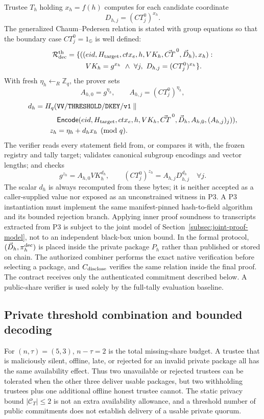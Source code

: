 \documentclass[pdflatex,sn-mathphys-num]{sn-jnl}%
\theoremstyle{thmstyleone}%
\theoremstyle{thmstyletwo}%
\theoremstyle{thmstylethree}%
\begin{document}
Trustee $T_h$ holding $x_h=f(h)$ computes for each candidate coordinate
\[
 D_{h,j}=(CT_j^0)^{x_h}.
\]
The generalized Chaum--Pedersen relation is stated with group equations so
that the boundary case $CT_j^0=1_{\mathbb G}$ is well defined:
\[
\begin{aligned}
 \mathcal R_{\rm dec}^{\rm th}=\{((&eid,H_{\rm target},ctx_e,h,
 VK_h,\vec{CT}^{\,0},\vec D_h),x_h):\\
 &VK_h=g^{x_h}\ \land\
 \forall j,\ D_{h,j}=(CT_j^0)^{x_h}\}.
\end{aligned}
\]
With fresh $\eta_h\leftarrow_R\mathbb Z_q$, the prover sets
\[
 A_{h,0}=g^{\eta_h},\qquad A_{h,j}=(CT_j^0)^{\eta_h},
\]
\[
\begin{aligned}
 d_h=H_q(&\mathtt{VV/THRESHOLD/DKEY/v1}\parallel\\
 &\mathsf{Encode}(eid,H_{\rm target},ctx_e,h,VK_h,
 \vec{CT}^{\,0},\vec D_h,A_{h,0},(A_{h,j})_j)),\\
 z_h&=\eta_h+d_hx_h\pmod q.
\end{aligned}
\]
The verifier reads every statement field from, or compares it with, the frozen
registry and tally target; validates canonical subgroup encodings and vector
lengths; and checks
\[
 g^{z_h}=A_{h,0}VK_h^{d_h},\qquad
 (CT_j^0)^{z_h}=A_{h,j}D_{h,j}^{d_h}\quad\forall j.
\]
The scalar $d_h$ is always recomputed from these bytes; it is neither accepted
as a caller-supplied value nor exposed as an unconstrained witness in P3.  A
P3 instantiation must implement the same manifest-pinned hash-to-field
algorithm and its bounded rejection branch.  Applying inner proof soundness
to transcripts extracted from P3 is subject to the joint model of
Section~\ref{subsec:joint-proof-model}, not to an independent black-box union
bound.
In the formal protocol, $(\vec D_h,\pi_h^{\rm dec})$ is placed inside the
private package $P_h$ rather than published or stored on chain.  The authorized
combiner performs the exact native verification before selecting a package,
and $C_{\rm disclose}$ verifies the same relation inside the final proof.  The
contract receives only the authenticated commitment described below.  A
public-share verifier is used solely by the full-tally evaluation baseline.

\subsection{Private threshold combination and bounded decoding}
\label{subsec:threshold-combination}

For $(n,\tau)=(5,3)$, $n-\tau=2$ is the total missing-share budget.  A
trustee that is maliciously silent, offline, late, or rejected for an invalid
private package all has the same availability effect.  Thus two unavailable
or rejected trustees can be tolerated when the other three deliver usable
packages, but two withholding trustees plus one additional offline honest
trustee cannot.  The static privacy bound $|\mathcal C_T|\leq2$ is not an
extra availability allowance, and a threshold number of public commitments
does not establish delivery of a usable private quorum.
\end{document}
